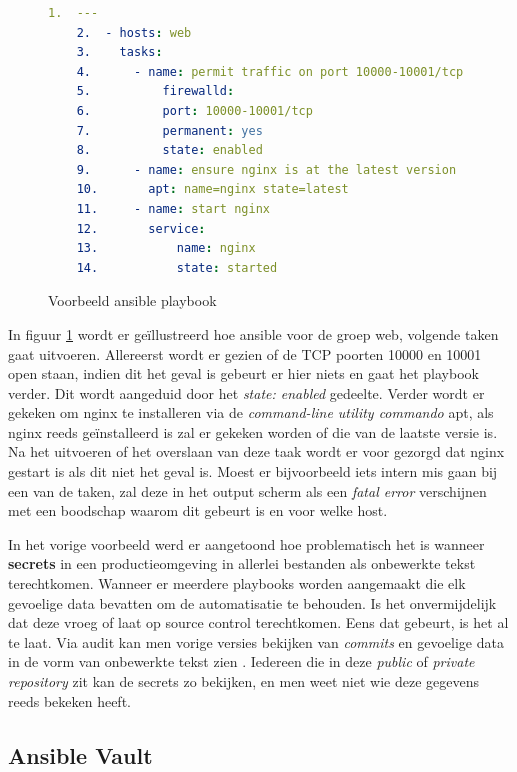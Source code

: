 \begin{figure}[hbtp]
    \caption{Voorbeeld ansible playbook}
    \begin{lstlisting}[language=yaml,frame=single]
    1.	---
    2.	- hosts: web
    3.	  tasks:
    4.      - name: permit traffic on port 10000-10001/tcp
    5.          firewalld:
    6.          port: 10000-10001/tcp
    7.          permanent: yes
    8.          state: enabled
    9.	    - name: ensure nginx is at the latest version
    10.	      apt: name=nginx state=latest
    11.	    - name: start nginx
    12.	      service:
    13.	          name: nginx
    14.	          state: started
    \end{lstlisting}
    \label{fig:playbookvb}
\end{figure}

In figuur \ref{fig:playbookvb} wordt er geïllustreerd hoe ansible voor de groep web, volgende taken gaat uitvoeren. Allereerst wordt er gezien of de TCP poorten 10000 en 10001 open staan, indien dit het geval is gebeurt er hier niets en gaat het playbook verder. Dit wordt aangeduid door het \textit{state: enabled} gedeelte. Verder wordt er gekeken om nginx te installeren via de \textit{command-line utility commando} apt, als nginx reeds geïnstalleerd is zal er gekeken worden of die van de laatste versie is. Na het uitvoeren of het overslaan van deze taak wordt er voor gezorgd dat nginx gestart is als dit niet het geval is. Moest er bijvoorbeeld iets intern mis gaan bij een van de taken, zal deze in het output scherm als een \textit{fatal error} verschijnen met een boodschap waarom dit gebeurt is en voor welke host.

In het vorige voorbeeld werd er aangetoond hoe problematisch het is wanneer \textbf{secrets} in een productieomgeving in allerlei bestanden als onbewerkte tekst terechtkomen. Wanneer er meerdere playbooks worden aangemaakt die elk gevoelige data bevatten om de automatisatie te behouden. Is het onvermijdelijk dat deze vroeg of laat op source control terechtkomen. Eens dat gebeurt, is het al te laat. Via audit kan men vorige versies bekijken van \textit{commits} en gevoelige data in de vorm van onbewerkte tekst zien \autocite{Wehner2015}. Iedereen die in deze \textit{public} of \textit{private repository} zit kan de secrets zo bekijken, en men weet niet wie deze gegevens reeds bekeken heeft. 

\subsection{Ansible Vault} 

